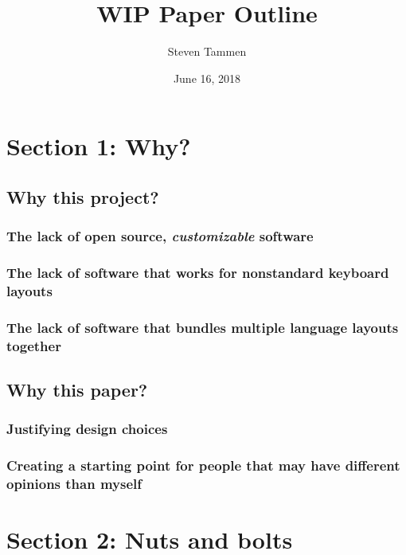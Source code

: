 \documentclass[11pt]{article}
\author{Steven Tammen}
\date{June 16, 2018}
\title{WIP Paper Outline}
\begin{document}
\maketitle
\setcounter{tocdepth}{2}
\tableofcontents



\section{Section 1: Why?}
\label{sec:org26dbdb8}

\subsection{Why this project?}
\label{sec:org063d07c}

\subsubsection{The lack of open source, \emph{customizable} software}
\label{sec:org3d108d3}

\subsubsection{The lack of software that works for nonstandard keyboard layouts}
\label{sec:orgb2ee701}

\subsubsection{The lack of software that bundles multiple language layouts together}
\label{sec:org0261d48}

\subsection{Why this paper?}
\label{sec:org4903d9c}

\subsubsection{Justifying design choices}
\label{sec:org631a49c}

\subsubsection{Creating a starting point for people that may have different opinions than myself}
\label{sec:org2d16784}

\section{Section 2: Nuts and bolts}
\label{sec:org6283516}
\end{document}
